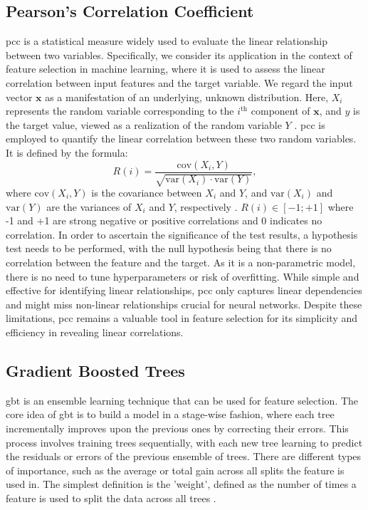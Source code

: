 \documentclass[12pt, a4paper, headinclude, twoside, plainheadsepline, open=right, numbers=noenddot, hidelinks, toc=listof, toc=bibliography]{scrreprt}
\begin{document}
\subsection{Pearson's Correlation Coefficient}
\label{ssec:pearsons}
\Ac{pcc} is a statistical measure widely used to evaluate the linear relationship between two variables. 
Specifically, we consider its application in the context of feature selection in machine learning, where it is used to assess the linear correlation between input features and the target variable. 
We regard the input vector $\mathbf{x}$ as a manifestation of an underlying, unknown distribution. 
Here, $X_i$ represents the random variable corresponding to the $i^{\text{th}}$ component of $\mathbf{x}$, and $y$ is the target value, viewed as a realization of the random variable $Y$ \cite{guyonIntroductionVariableFeature}. 
\Ac{pcc} is employed to quantify the linear correlation between these two random variables. It is defined by the formula:
\begin{equation}
R(i) = \frac{\text{cov}(X_i, Y)}{\sqrt{\text{var}(X_i) \cdot \text{var}(Y)}},
\end{equation}
where $\text{cov}(X_i, Y)$ is the covariance between $X_i$ and $Y$, and $\text{var}(X_i)$ and $\text{var}(Y)$ are the variances of $X_i$ and $Y$, respectively \cite{chandrashekarSurveyFeatureSelection2014}.
$R(i) \in [-1; +1]$ where -1 and +1 are strong negative or positive correlations and 0 indicates no correlation. 
In order to ascertain the significance of the test results, a hypothesis test needs to be performed, with the null hypothesis being that there is no correlation between the feature and the target.
As it is a non-parametric model, there is no need to tune hyperparameters or risk of overfitting.
While simple and effective for identifying linear relationships, \ac{pcc} only captures linear dependencies and might miss non-linear relationships crucial for neural networks.
Despite these limitations, \ac{pcc} remains a valuable tool in feature selection for its simplicity and efficiency in revealing linear correlations.

\subsection{Gradient Boosted Trees}
\label{ssec:gbt}

\Ac{gbt} is an ensemble learning technique that can be used for feature selection. 
The core idea of \ac{gbt} is to build a model in a stage-wise fashion, where each tree incrementally improves upon the previous ones by correcting their errors. 
This process involves training trees sequentially, with each new tree learning to predict the residuals or errors of the previous ensemble of trees.
There are different types of importance, such as the average or total gain across all splits the feature is used in.
The simplest definition is the 'weight', defined as the number of times a feature is used to split the data across all trees \cite{chenXGBoostScalableTree2016}.
\end{document}

